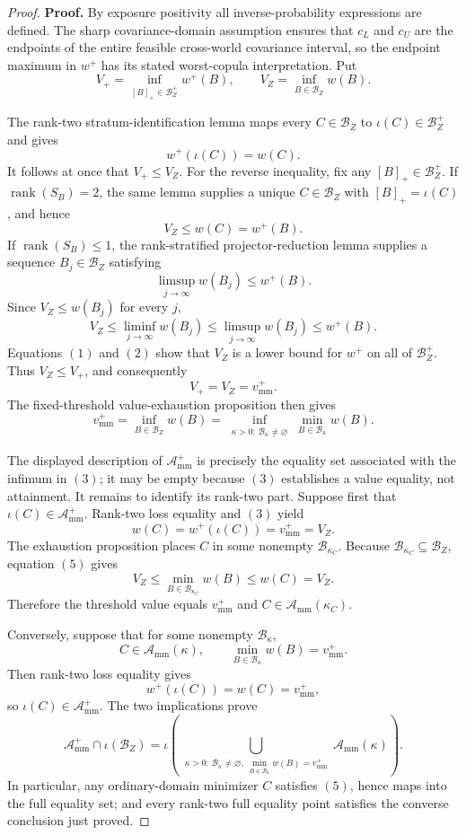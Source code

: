 \documentclass{article}
\begin{document}
\begin{proof}
\textbf{Proof.}
By exposure positivity all inverse-probability expressions are defined.  The sharp covariance-domain assumption ensures that \(c_L\) and \(c_U\) are the endpoints of the entire feasible cross-world covariance interval, so the endpoint maximum in \(w^+\) has its stated worst-copula interpretation.  Put
\[
 V_+=\inf_{[B]_+\in\mathcal B_Z^+}w^+(B),
 \qquad
 V_Z=\inf_{B\in\mathcal B_Z}w(B).
\]

The rank-two stratum-identification lemma maps every \(C\in\mathcal B_Z\) to \(\iota(C)\in\mathcal B_Z^+\) and gives
\[
 w^+(\iota(C))=w(C).
\]
It follows at once that \(V_+\le V_Z\).  For the reverse inequality, fix any \([B]_+\in\mathcal B_Z^+\).  If \(\operatorname{rank}(S_B)=2\), the same lemma supplies a unique \(C\in\mathcal B_Z\) with \([B]_+=\iota(C)\), and hence
\[
 V_Z\le w(C)=w^+(B).
\tag{1}
\]
If \(\operatorname{rank}(S_B)\le1\), the rank-stratified projector-reduction lemma supplies a sequence \(B_j\in\mathcal B_Z\) satisfying
\[
 \limsup_{j\to\infty}w(B_j)\le w^+(B).
\]
Since \(V_Z\le w(B_j)\) for every \(j\),
\[
 V_Z
 \le\liminf_{j\to\infty}w(B_j)
 \le\limsup_{j\to\infty}w(B_j)
 \le w^+(B).
\tag{2}
\]
Equations \((1)\) and \((2)\) show that \(V_Z\) is a lower bound for \(w^+\) on all of \(\mathcal B_Z^+\).  Thus \(V_Z\le V_+\), and consequently
\[
 V_+=V_Z=v_{\mathrm{mm}}^+.
\tag{3}
\]
The fixed-threshold value-exhaustion proposition then gives
\[
 v_{\mathrm{mm}}^+
 =\inf_{B\in\mathcal B_Z}w(B)
 =\inf_{\substack{\kappa>0:\,\mathcal B_\kappa\ne\varnothing}}
 \min_{B\in\mathcal B_\kappa}w(B).
\tag{4}
\]

The displayed description of \(\mathcal A_{\mathrm{mm}}^+\) is precisely the equality set associated with the infimum in \((3)\); it may be empty because \((3)\) establishes a value equality, not attainment.  It remains to identify its rank-two part.  Suppose first that \(\iota(C)\in\mathcal A_{\mathrm{mm}}^+\).  Rank-two loss equality and \((3)\) yield
\[
 w(C)=w^+(\iota(C))=v_{\mathrm{mm}}^+=V_Z.
\tag{5}
\]
The exhaustion proposition places \(C\) in some nonempty \(\mathcal B_{\kappa_C}\).  Because \(\mathcal B_{\kappa_C}\subseteq\mathcal B_Z\), equation \((5)\) gives
\[
 V_Z
 \le\min_{B\in\mathcal B_{\kappa_C}}w(B)
 \le w(C)
 =V_Z.
\]
Therefore the threshold value equals \(v_{\mathrm{mm}}^+\) and \(C\in\mathcal A_{\mathrm{mm}}(\kappa_C)\).

Conversely, suppose that for some nonempty \(\mathcal B_\kappa\),
\[
 C\in\mathcal A_{\mathrm{mm}}(\kappa),
 \qquad
 \min_{B\in\mathcal B_\kappa}w(B)=v_{\mathrm{mm}}^+.
\]
Then rank-two loss equality gives
\[
 w^+(\iota(C))=w(C)=v_{\mathrm{mm}}^+,
\]
so \(\iota(C)\in\mathcal A_{\mathrm{mm}}^+\).  The two implications prove
\[
\mathcal A_{\mathrm{mm}}^+\cap\iota(\mathcal B_Z)
=\iota\!\left(
\bigcup_{\substack{\kappa>0:\,
\mathcal B_\kappa\ne\varnothing,\ 
\min_{B\in\mathcal B_\kappa}w(B)=v_{\mathrm{mm}}^+}}
\mathcal A_{\mathrm{mm}}(\kappa)\right).
\tag{6}
\]
In particular, any ordinary-domain minimizer \(C\) satisfies \((5)\), hence maps into the full equality set; and every rank-two full equality point satisfies the converse conclusion just proved.


\end{proof}
\end{document}

